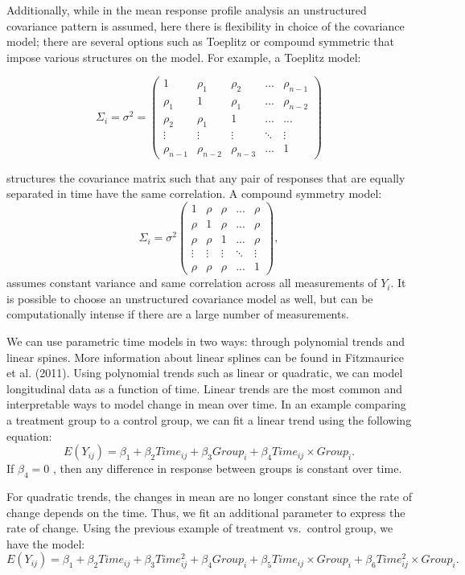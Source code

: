 \documentclass[12pt, twoside]{amherstthesis}
\begin{document}
Additionally, while in the mean response profile analysis an unstructured covariance pattern is assumed, here there is flexibility in choice of the covariance model; there are several options such as Toeplitz or compound symmetric that impose various structures on the model. For example, a Toeplitz model:

\[\Sigma_i = \sigma^2 = \begin{pmatrix} 1 & \rho_1 & \rho_2 & ... & \rho_{n-1} \\ \rho_1 & 1 & \rho_1 & ... & \rho_{n-2} \\ \rho_2 & \rho_1 & 1 & ...& ... \\ \vdots & \vdots & \vdots & \ddots & \vdots \\ \rho_{n-1} & \rho_{n-2} & \rho_{n-3} & ... & 1  \end{pmatrix}\]

structures the covariance matrix such that any pair of responses that are equally separated in time have the same correlation. A compound symmetry model: \[\Sigma_i = \sigma^2\begin{pmatrix} 1 & \rho & \rho & ... & \rho \\ \rho & 1 & \rho & ... & \rho \\ \rho & \rho & 1 & ...& \rho \\ \vdots & \vdots & \vdots & \ddots& \vdots \\ \rho & \rho & \rho & ... & 1   \end{pmatrix}, \] assumes constant variance and same correlation across all measurements of \(Y_i.\) It is possible to choose an unstructured covariance model as well, but can be computationally intense if there are a large number of measurements.

We can use parametric time models in two ways: through polynomial trends and linear spines. More information about linear splines can be found in Fitzmaurice et al. (2011). Using polynomial trends such as linear or quadratic, we can model longitudinal data as a function of time. Linear trends are the most common and interpretable ways to model change in mean over time. In an example comparing a treatment group to a control group, we can fit a linear trend using the following equation: \[E(Y_{ij}) = \beta_1 + \beta_2Time_{ij}+\beta_3Group_i+\beta_4Time_{ij} \times Group_i.\] If \(\beta_4 = 0\) , then any difference in response between groups is constant over time.

For quadratic trends, the changes in mean are no longer constant since the rate of change depends on the time. Thus, we fit an additional parameter to express the rate of change.
Using the previous example of treatment vs.~control group, we have the model:
\[E(Y_{ij}) = \beta_1 + \beta_2Time_{ij}+\beta_3Time^2_{ij}+\beta_4Group_i + \beta_5Time_{ij} \times Group_i + \beta_6Time^2_{ij} \times Group_i.\]
\end{document}
